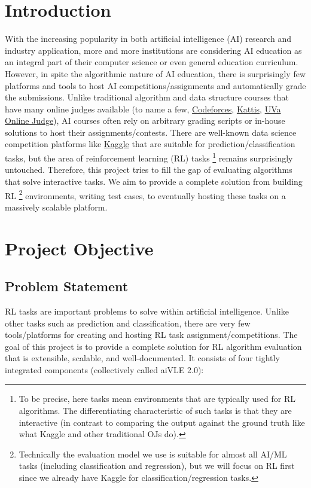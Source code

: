 \documentclass[fyp]{socreport}
\begin{document}
\chapter{Introduction}
With the increasing popularity in both artificial intelligence (AI) research and industry application, more and more institutions are considering AI education as an integral part of their computer science or even general education curriculum. However, in spite the algorithmic nature of AI education, there is surprisingly few platforms and tools to host AI competitions/assignments and automatically grade the submissions. Unlike traditional algorithm and data structure courses that have many online judges available (to name a few, \href{https://codeforces.com/}{Codeforces}, \href{https://open.kattis.com/}{Kattis}, \href{https://onlinejudge.org/}{UVa Online Judge}), AI courses often rely on arbitrary grading scripts or in-house solutions to host their assignments/contests. There are well-known data science competition platforms like \href{https://www.kaggle.com/}{Kaggle} that are suitable for prediction/classification tasks, but the area of reinforcement learning (RL) tasks \footnote{To be precise, here tasks mean environments that are typically used for RL algorithms. The differentiating characteristic of such tasks is that they are interactive (in contrast to comparing the output against the ground truth like what Kaggle and other traditional OJs do).} remains surprisingly untouched. Therefore, this project tries to fill the gap of evaluating algorithms that solve interactive tasks. We aim to provide a complete solution from building RL \footnote{Technically the evaluation model we use is suitable for almost all AI/ML tasks (including classification and regression), but we will focus on RL first since we already have Kaggle for classification/regression tasks.} environments, writing test cases, to eventually hosting these tasks on a massively scalable platform.

\chapter{Project Objective}
\section{Problem Statement}
RL tasks are important problems to solve within artificial intelligence. Unlike other tasks such as prediction and classification, there are very few tools/platforms for creating and hosting RL task assignment/competitions. The goal of this project is to provide a complete solution for RL algorithm evaluation that is extensible, scalable, and well-documented. It consists of four tightly integrated components (collectively called aiVLE 2.0):
\end{document}
